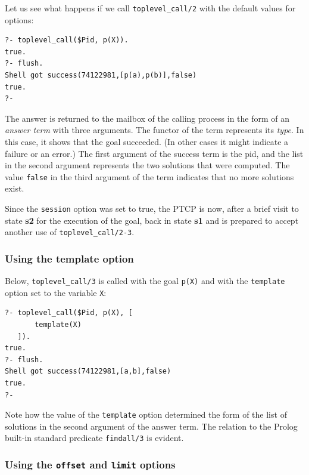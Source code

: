 Let us see what happens if we call \texttt{toplevel\_call/2} with the default values for options:

\begin{verbatim}
?- toplevel_call($Pid, p(X)).
true.
?- flush.
Shell got success(74122981,[p(a),p(b)],false)
true.
?-
\end{verbatim}

\noindent The answer is returned to the mailbox of the calling process in the form of an \textit{answer term} with three arguments. The functor of the term represents its \textit{type}. In this case, it shows that the goal succeeded. (In other cases it might indicate a failure or an error.) The first argument of the success term is the pid, and the list in the second argument represents the two solutions that were computed. The value \texttt{false} in the third argument of the term indicates that no more solutions exist. 

Since the \texttt{session} option was set to true, the PTCP is now, after a brief visit to state \textbf{s2} for the execution of the goal, back in state \textbf{s1} and is prepared to accept another use of \texttt{toplevel\_call/2-3}.

\subsubsection{Using the template option}\label{sec:toplevel-template}

Below, \texttt{toplevel\_call/3} is called with the goal \texttt{p(X)} and with the \texttt{template} option set to the variable \texttt{X}:

\begin{verbatim}
?- toplevel_call($Pid, p(X), [
       template(X)
   ]).
true.
?- flush.
Shell got success(74122981,[a,b],false)
true.
?-
\end{verbatim}

\noindent Note how the value of the \texttt{template} option determined the form of the list of solutions in the second argument of the answer term. The relation to the Prolog built-in standard predicate \texttt{findall/3} is evident. %

\subsubsection{Using the \texttt{offset} and \texttt{limit}  options}\label{sec:toplevel-paging}

